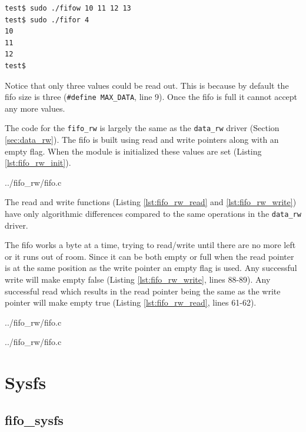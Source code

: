 \documentclass{article}
\begin{document}
\begin{verbatim}
test$ sudo ./fifow 10 11 12 13
test$ sudo ./fifor 4
10
11
12
test$
\end{verbatim}

Notice that only three values could be read out.
This is because by default the fifo size is three
(\verb+#define MAX_DATA+, line 9).
Once the fifo is full it cannot accept any more values.

The code for the \verb+fifo_rw+ is largely the same as the \verb+data_rw+
driver (Section \ref{sec:data_rw}).
The fifo is built using read and write pointers along with an empty flag.
When the module is initialized these values are
set (Listing \ref{lst:fifo_rw_init}).


	{../fifo_rw/fifo.c}

The read and write functions
(Listing \ref{lst:fifo_rw_read} and \ref{lst:fifo_rw_write})
have only algorithmic differences compared to the same operations in the
\verb+data_rw+ driver.

The fifo works a byte at a time,
trying to read/write until there are no more left or it runs out of room.
Since it can be both empty or full when the read pointer is at the
same position as the write pointer an empty flag is used.
Any successful write will make empty false
(Listing \ref{lst:fifo_rw_write}, lines 88-89).
Any successful read which results in the read pointer being the same as the
write pointer will make empty
true (Listing \ref{lst:fifo_rw_read}, lines 61-62).


	{../fifo_rw/fifo.c}


	{../fifo_rw/fifo.c}

\clearpage
\section{Sysfs}


\subsection{fifo\_sysfs}
\end{document}
